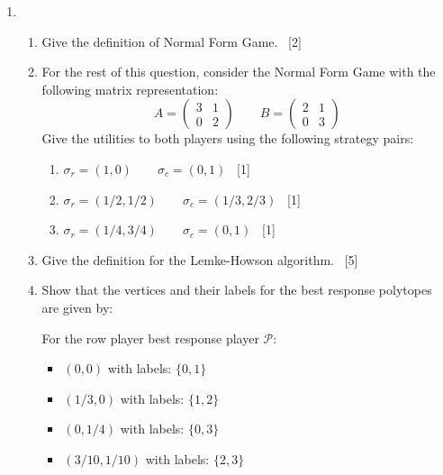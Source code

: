 \documentclass[12pt,a4paper]{article}
\renewcommand{\labelenumi}{\arabic{enumi}} %
\begin{document}
\null \vskip1cm
\begin{enumerate}

\renewcommand\labelenumi{\bfseries\theenumi.}

\item

    \begin{enumerate}
        \item Give the definition of Normal Form Game.
        ~\hfill{[2]}
        \item For the rest of this question, consider the Normal Form Game with
            the following matrix representation:
            $$A=
                \begin{pmatrix}
                    3 & 1\\
                    0 & 2
                \end{pmatrix}
              \qquad
              B=
                \begin{pmatrix}
                    2 & 1\\
                    0 & 3
                \end{pmatrix}
            $$
            Give the utilities to both players using the following strategy
            pairs:

            \begin{enumerate}
                \item $\sigma_r=(1, 0)\qquad\sigma_c=(0,1)$
                    ~\hfill{[1]}
                \item $\sigma_r=(1/2, 1/2)\qquad\sigma_c=(1/3,2/3)$
                    ~\hfill{[1]}
                \item $\sigma_r=(1/4, 3/4)\qquad\sigma_c=(0,1)$
                    ~\hfill{[1]}
            \end{enumerate}
        \item Give the definition for the Lemke-Howson algorithm.
            ~\hfill{[5]}
        \item Show that the vertices and their labels for the best response
            polytopes are given by:

            For the row player best response player \(\mathcal{P}\):

            \begin{itemize}
                \item $(0, 0)$ with labels: $\{0, 1\}$
                \item $(1/3, 0)$ with labels: $\{1, 2\}$
                \item $(0, 1/4)$ with labels: $\{0, 3\}$
                \item $(3/10, 1/10)$ with labels: $\{2, 3\}$
            \end{itemize}


\end{enumerate}
\end{enumerate}
\end{document}
